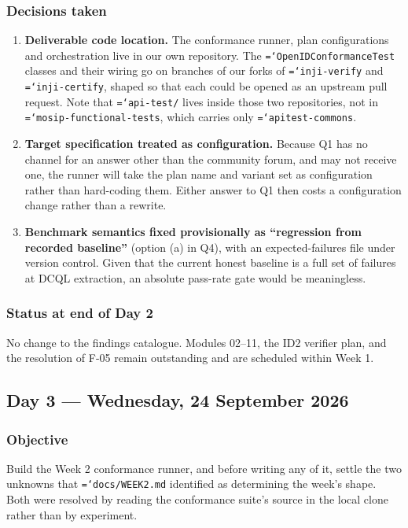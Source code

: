 \documentclass[11pt,a4paper]{article}
\newcommand{\tightlist}{\setlength{\itemsep}{0pt}\setlength{\parskip}{0pt}\setlength{\parsep}{0pt}}
\let\origtexttt\texttt
\renewcommand{\texttt}[1]{\origtexttt{\hyphenchar\font=`\-\relax #1}}
\renewcommand{\_}{\textunderscore\allowbreak}
\begin{document}
\subsubsection*{Decisions taken}
\begin{enumerate}\tightlist
  \item \textbf{Deliverable code location.} The conformance runner, plan configurations and
        orchestration live in our own repository. The \texttt{OpenIDConformanceTest} classes
        and their wiring go on branches of our forks of \texttt{inji-verify} and
        \texttt{inji-certify}, shaped so that each could be opened as an upstream pull
        request. Note that \texttt{api-test/} lives inside those two repositories, not in
        \texttt{mosip-functional-tests}, which carries only \texttt{apitest-commons}.
  \item \textbf{Target specification treated as configuration.} Because Q1 has no channel
        for an answer other than the community forum, and may not receive one, the runner
        will take the plan name and variant set as configuration rather than hard-coding
        them. Either answer to Q1 then costs a configuration change rather than a rewrite.
  \item \textbf{Benchmark semantics fixed provisionally as ``regression from recorded
        baseline''} (option (a) in Q4), with an expected-failures file under version
        control. Given that the current honest baseline is a full set of failures at DCQL
        extraction, an absolute pass-rate gate would be meaningless.
\end{enumerate}

\subsubsection*{Status at end of Day 2}
No change to the findings catalogue. Modules 02--11, the ID2 verifier plan, and the
resolution of F-05 remain outstanding and are scheduled within Week 1.

\subsection{Day 3 --- Wednesday, 24 September 2026}

\subsubsection*{Objective}
Build the Week 2 conformance runner, and before writing any of it, settle the two
unknowns that \texttt{docs/WEEK2.md} identified as determining the week's shape. Both were
resolved by reading the conformance suite's source in the local clone rather than by
experiment.
\end{document}
